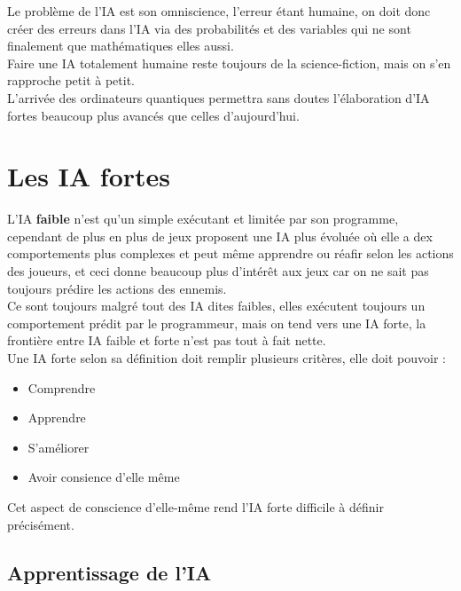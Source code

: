 \documentclass[a4paper,10pt,final,fleqn]{article}
\begin{document}
		Le problème de l'IA est son omniscience, l'erreur étant humaine, on doit donc créer des erreurs dans l'IA via des probabilités et des variables qui ne sont finalement que mathématiques elles aussi.\\

		Faire une IA totalement humaine reste toujours de la science-fiction, mais on s'en rapproche petit à petit.\\
		L'arrivée des ordinateurs quantiques permettra sans doutes l'élaboration d'IA fortes beaucoup plus avancés que celles d'aujourd'hui.\\

\section{Les IA fortes}
	
	L'IA \textbf{faible} n'est qu'un simple exécutant et limitée par son programme, cependant de plus en plus de jeux proposent une IA plus évoluée où elle a dex comportements plus complexes et peut même apprendre ou réafir selon les actions des joueurs, et ceci donne beaucoup plus d'intérêt aux jeux car on ne sait pas toujours prédire les actions des ennemis.\\

	Ce sont toujours malgré tout des IA dites faibles, elles exécutent toujours un comportement prédit par le programmeur, mais on tend vers une IA forte, la frontière entre IA faible et forte n'est pas tout à fait nette.\\

	Une IA forte selon sa définition doit remplir plusieurs critères, elle doit pouvoir : \\
	\begin{itemize}
		\item Comprendre
		\item Apprendre
		\item S'améliorer
		\item Avoir consience d'elle même\\
	\end{itemize}

	Cet aspect de conscience d'elle-même rend l'IA forte difficile à définir précisément.\\

	\subsection{Apprentissage de l'IA}
\end{document}
